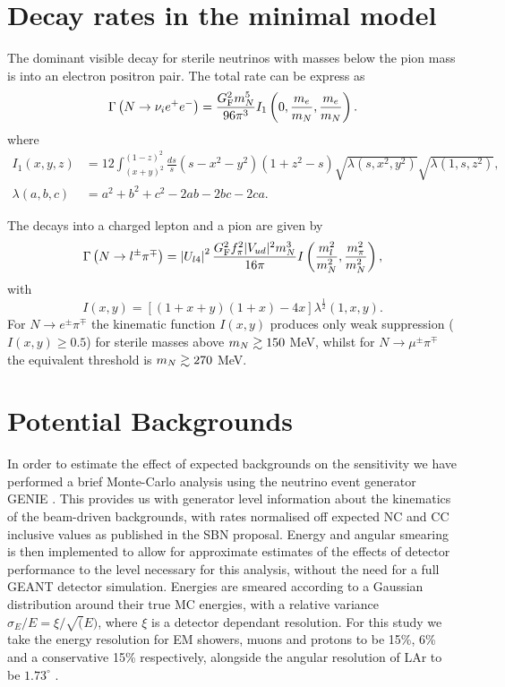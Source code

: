 \documentclass[11pt, a4paper]{article}
\def\ster{\ensuremath N}
\begin{document}
\appendix

\section{\label{app:decayrates}Decay rates in the minimal model}

The dominant visible decay for sterile neutrinos with masses below the pion
mass is into an electron positron pair. The total rate can be express as
%
\[ \Gamma\left(\ster\to \nu_i e^+e^-\right) =
\frac{G_\text{F}^2m_\ster^5}{96\pi^3}I_1\left(0,\frac{m_e}{m_\ster},\frac{
m_e}{m_\ster}\right).  \]
%
where
% 
\begin{align} I_1(x,y,z) & =12 \int_{(x+y)^2}^{(1-z)^2}
\frac{ds}{s}(s-x^2-y^2)(1+z^2-s)\sqrt{\lambda(s,x^2,y^2)}\sqrt{\lambda(1,s,z^2)},\\
\lambda(a,b,c) &= a^2+b^2+c^2 - 2ab-2bc-2ca.  \end{align}

The decays into a charged lepton and a pion are given by 
%
\[ \Gamma\left(\ster\to l^\pm\pi^\mp\right) =
\left|U_{l4}\right|^2\frac{G_\text{F}^2f_\pi^2 |V_{ud}|^2
m_\ster^3}{16\pi}I\left(\frac{m_l^2}{m_\ster^2} ,
\frac{m_\pi^2}{m_\ster^2}\right) , \] 
%
with \[ I(x,y) = \left[ \left( 1+x+y\right) \left(1+x\right) -4 x\right]
\lambda^\frac{1}{2}\left(1,x,y\right).  \]
%
For $N\to e^\pm\pi^\mp$ the kinematic function $I(x,y)$ produces only weak suppression ($I(x,y)\geq 0.5$) for sterile masses above $m_\ster\gtrsim 150$ MeV, whilst for $N\to
\mu^\pm\pi^\mp$ the equivalent threshold is $m_\ster\gtrsim 270$ MeV.

\section{Potential Backgrounds\label{sec:bg}}

In order to estimate the effect of expected backgrounds on the sensitivity we
have performed a brief Monte-Carlo analysis using the neutrino event generator GENIE
\cite{Andreopoulos:2009rq}. This provides us with generator level information about the
kinematics of the beam-driven backgrounds, with rates normalised off expected
NC and CC inclusive values as published in the SBN proposal. Energy and angular
smearing is then implemented to allow for approximate estimates of the effects
of detector performance to the level necessary for this analysis, without the
need for a full GEANT detector simulation. Energies are smeared according to a
Gaussian distribution around their true MC energies, with a relative variance
$\sigma_E/E = \xi/ \sqrt(E) $, where $\xi$ is a detector dependant resolution.
For this study we take the energy resolution for EM showers, muons and protons
to be 15\%, 6\% and a conservative 15\% respectively, alongside the angular
resolution of LAr to be $1.73^{\circ}$ \cite{Antonello:2015lea}. 
\end{document}
